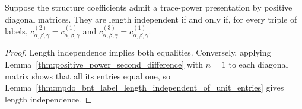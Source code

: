 \begin{lemma}%
    \label{thm:mpdo_finite_length_independence}
    \leanok
    Suppose the structure coefficients admit a trace-power presentation
    by positive diagonal matrices. They are length independent if and
    only if, for every triple of labels,
    $c^{(2)}_{\alpha,\beta,\gamma}=c^{(1)}_{\alpha,\beta,\gamma}$ and
    $c^{(3)}_{\alpha,\beta,\gamma}=c^{(1)}_{\alpha,\beta,\gamma}$.
\end{lemma}
\begin{proof}\leanok
    Length independence implies both equalities. Conversely, applying
    Lemma~\ref{thm:positive_power_second_difference} with $n=1$ to
    each diagonal matrix shows that all its entries equal one, so
    Lemma~\ref{thm:mpdo_bnt_label_length_independent_of_unit_entries}
    gives length independence.
\end{proof}
